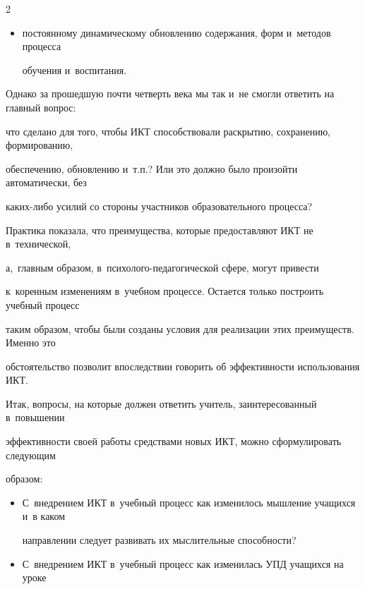\begin{multicols}{2}
\begin{itemize}
взаимосвязи между естественными и~гуманитарными нау\-ками;


\item постоянному динамическому обновлению содержания, форм и~методов процесса


обучения и~воспитания.


\end{itemize}





  Однако за прошедшую почти четверть века мы так и~не смогли ответить на главный вопрос:


что сделано для того, чтобы ИКТ способствовали раскрытию, сохранению, формированию,


обеспечению, обновлению и~т.п.? Или это должно было произойти автоматически, без


  ка\-ких-ли\-бо усилий со стороны участников образовательного процесса?





  Практика показала, что преимущества, которые предоставляют ИКТ не в~технической,


а,~главным образом, в~пси\-хо\-ло\-го-пе\-да\-го\-ги\-че\-ской сфере, могут привести


к~коренным изменениям в~учебном процессе. Остается только построить учебный процесс


таким образом, чтобы были созданы условия для реализации этих преимуществ. Именно это


обстоятельство позволит впоследствии говорить об эффективности использования ИКТ.





  Итак, вопросы, на которые должен ответить учитель, заинтересованный в~повышении


эффективности своей работы средствами новых ИКТ, можно сформулировать следующим


образом:


  \begin{itemize}


\item С~внедрением ИКТ в~учебный процесс как изменилось мышление учащихся и~в каком


направлении следует развивать их мыслительные способности?


\item С~внедрением ИКТ в~учебный процесс как изменилась УПД учащихся на уроке



\end{itemize}
\end{multicols}
